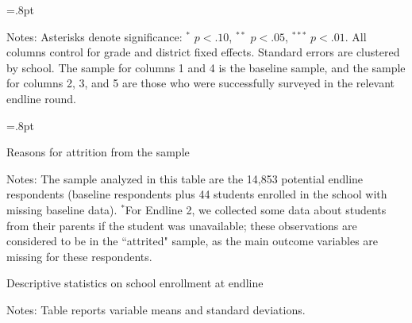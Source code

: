 \documentclass[letterpaper,12pt,pdftex]{article}
\begin{document}
\clearpage\newpage

\label{tab_surveyplace_attrition_bindices}
\begin{center}
\tabcolsep=.8pt
	\small
	
\end{center}
\flushleft \footnotesize {Notes: Asterisks denote significance: $^*$ $p < .10$, $^{**}$ $p < .05$, $^{***}$ $p < .01$. All columns control for grade and district fixed effects. Standard errors are clustered by school. The sample for columns 1 and 4 is the baseline sample, and the sample for columns 2, 3, and 5 are those who were successfully surveyed in the relevant endline round.}
\restoregeometry

\clearpage
\newpage

\newpage \normalsize
\begin{table}
\tabcolsep=.8pt
\caption{Reasons for attrition from the sample}
\label{tab_sample_status}
\begin{threeparttable}
\centering
\vspace{1cm}
		{\captionsetup{justification=raggedright,singlelinecheck=false}
		\small {
		\flushleft \hspace{1cm} 
	\vspace{2cm}
		\flushleft \hspace{1cm} 
		}
		}

\vspace{0.5cm}
\flushleft \footnotesize {Notes: The sample analyzed in this table are the 14,853 potential endline respondents (baseline respondents plus 44 students enrolled in the school with missing baseline data). $^*$\;For Endline 2, we collected some data about students from their parents if the student was unavailable; these observations are considered to be in the ``attrited" sample, as the main outcome variables are missing for these respondents.}
\end{threeparttable}
\end{table}

\clearpage
\addtocounter{table}{-1}
\newpage 

\normalsize
\begin{table}
\tabcolsep=5.8pt
		\caption{Descriptive statistics on school enrollment at endline}\label{tab_sum_stats_outcomes}
			\vspace{.4cm}
		\begin{center}
			
        \end{center}
\flushleft \footnotesize {Notes: Table reports variable means and standard deviations.}
\end{table}
\restoregeometry
\end{document}
